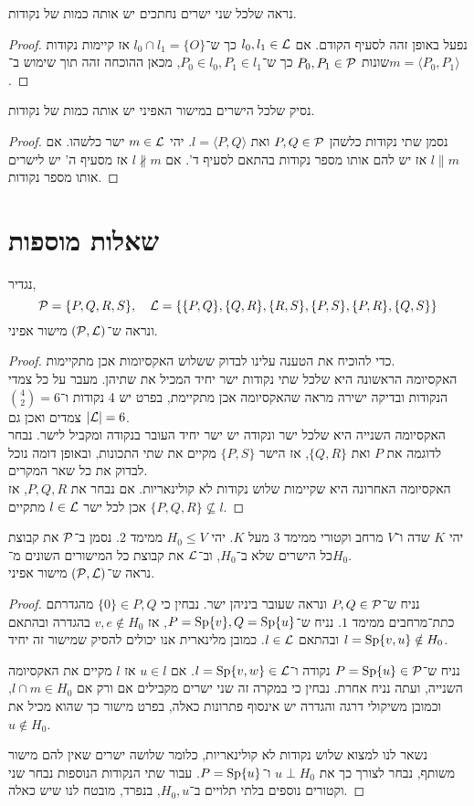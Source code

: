\subquestion{}
נראה שלכל שני ישרים נחתכים יש אותה כמות של נקודות.
\begin{proof}
	נפעל באופן זהה לסעיף הקודם.
	אם $l_0, l_1 \in \mathcal{L}$ כך ש־$l_0 \cap l_1 = \{ O \}$ אז קיימות נקודות שונות $P_0, P_1 \in \mathcal{P}$ כך ש־$P_0 \in l_0, P_1 \in l_1$, מכאן ההוכחה זהה תוך שימוש ב־$m = \langle P_0, P_1 \rangle$.
\end{proof}

\subquestion{}
נסיק שלכל הישרים במישור האפיני יש אותה כמות של נקודות.
\begin{proof}
	נסמן שתי נקודות כלשהן $P, Q \in \mathcal{P}$ ואת $l = \langle P, Q \rangle$.
	יהי $m \in \mathcal{L}$ ישר כלשהו.
	אם $l \parallel m$ אז יש להם אותו מספר נקודות בהתאם לסעיף ד'.
	אם $l \not\parallel m$ אז מסעיף ה' יש לישרים אותו מספר נקודות.
\end{proof}

\section{שאלות מוספות}
\subquestion[1]
נגדיר,
\[
	\mathcal{P} = \{ P, Q, R, S \},
	\quad
	\mathcal{L} = \{ \{P, Q\}, \{Q, R\}, \{R, S\}, \{P, S\}, \{P, R\}, \{Q, S\}\}
\]
ונראה ש־$(\mathcal{P}, \mathcal{L})$ מישור אפיני.
\begin{proof}
	כדי להוכיח את הטענה עלינו לבדוק ששלוש האקסיומות אכן מתקיימות. \\
	האקסיומה הראשונה היא שלכל שתי נקודות ישר יחיד המכיל את שתיהן.
	מעבר על כל צמדי הנקודות ובדיקה ישירה מראה שהאקסיומה אכן מתקיימת, בפרט יש 4 נקודות ו־$\binom{4}{2} = 6$ צמדים ואכן גם $|\mathcal{L}| = 6$. \\
	האקסיומה השנייה היא שלכל ישר ונקודה יש ישר יחיד העובר בנקודה ומקביל לישר.
	נבחר לדוגמה את $P$ ואת $\{Q, R\}$, אז הישר $\{P, S\}$ מקיים את שתי התכונות, ובאופן דומה נוכל לבדוק את כל שאר המקרים. \\
	האקסיומה האחרונה היא שקיימות שלוש נקודות לא קולינאריות.
	אם נבחר את $P, Q, R$, אז אכן לכל ישר $l \in \mathcal{L}$ מתקיים $\{P, Q, R\} \not\subseteq l$.
\end{proof}

\subquestion{}
יהי $K$ שדה ו־$V$ מרחב וקטורי ממימד $3$ מעל $K$.
יהי $H_0 \le V$ ממימד $2$.
נסמן ב־$\mathcal{P}$ את קבוצת כל הישרים שלא ב־$H_0$, וב־$\mathcal{L}$ את קבוצת כל המישורים השונים מ־$H_0$. \\
נראה ש־$(\mathcal{P}, \mathcal{L})$ מישור אפיני.
\begin{proof}
	נניח ש־$P, Q \in \mathcal{P}$ ונראה שעובר ביניהן ישר.
	נבחין כי $\{ 0 \} \in P, Q$ מהגדרתם כתת־מרחבים ממימד $1$.
	נניח ש־$P = \operatorname{Sp}\{ v \}, Q = \operatorname{Sp} \{ u \}$, אז $v, e \notin H_0$ בהגדרה ובהתאם $l = \operatorname{Sp}\{v, u\} \notin H_0$ ובהתאם $l \in \mathcal{L}$.
	כמובן מלינארית אנו יכולים להסיק שמישור זה יחיד.

	נניח ש־$P = \operatorname{Sp}\{ u \} \in \mathcal{P}$ נקודה ו־$l = \operatorname{Sp}\{v, w\} \in \mathcal{L}$.
	אם $u \in l$ אז $l$ מקיים את האקסיומה השנייה, ועתה נניח אחרת.
	נבחין כי במקרה זה שני ישרים מקבילים אם ורק אם $l \cap m \in H_0$, וכמובן משיקולי דרגה והגדרה יש אינסוף פתרונות כאלה, בפרט מישור כך שהוא מכיל את $u \notin H_0$.

	נשאר לנו למצוא שלוש נקודות לא קולינאריות, כלומר שלושה ישרים שאין להם מישור משותף, נבחר לצורך כך את $u \perp H_0$ ו־$P = \operatorname{Sp}\{ u \}$.
	עבור שתי הנקודות הנוספות נבחר שני וקטורים נוספים בלתי תלויים ב־$H_0, u$, בנפרד, מובטח לנו שיש כאלה.
\end{proof}

